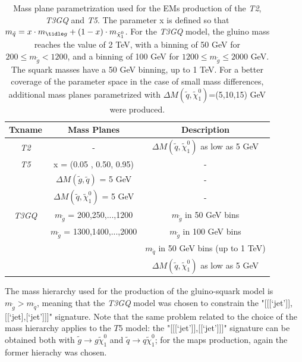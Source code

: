 \documentclass[a4paper,11pt]{article}
\begin{document}
\begin{table}[!htbp]
\footnotesize
\begin{center}
\renewcommand{\arraystretch}{1.4}
\begin{tabular}{ c c c} 
\toprule 
  \textbf{Txname} & \textbf{Mass Planes} & \textbf{Description} \\ \toprule \toprule
  \textit{T2} & - & $\Delta M(\tilde q, \tilde \chi _1 ^0)$ as low as 5 GeV \\ \midrule
  \textit{T5} & x = (0.05 , 0.50, 0.95) & - \\
       &  $\Delta M(\tilde g, \tilde q )$ = 5 GeV & - \\
       &  $\Delta M(\tilde q, \tilde \chi _1 ^0)$ = 5 GeV        & - \\ \midrule
  \textit{T3GQ}  &  $m_{\tilde g}$ = 200,250,...,1200       &  $m_{\tilde g}$ in 50 GeV bins \\ 
                 &  $m_{\tilde g}$ = 1300,1400,...,2000    &  $m_{\tilde g}$ in  100 GeV bins \\
                 &                                                                                                                  & $m_{\tilde q}$ in 50 GeV bins (up to 1 TeV) \\
                 &                                                                                                                         &  $\Delta M(\tilde q, \tilde \chi _1 ^0)$ as low as 5 GeV \\ 
\bottomrule \bottomrule
\end{tabular}
\end{center}
\caption{Mass plane parametrization used for the EMs production of the \textit{T2}, \textit{T3GQ} and \textit{T5}. The parameter x is defined so that $m_{\tilde q}= x\cdot m_{\tidle g} + (1-x)\cdot m_{\tilde \chi_1 ^0}$. For the \textit{T3GQ} model, the gluino mass reaches the value of 2 TeV, with a binning of 50 GeV for $200 \leq m_{\tilde g} < 1200$, and a binning of 100 GeV for $1200 \leq m_{\tilde g}  \leq 2000$ GeV. The squark masses have a 50 GeV binning, up to 1 TeV. For a better coverage of the parameter space in the case of small mass differences, additional mass planes parametrized with $\Delta M ( \tilde q, \tilde \chi _1 ^0)$=(5,10,15) GeV were produced. }
\label{TGQ_Planes} 
\end{table}
%
%
The mass hierarchy used for the production of the gluino-squark model is $m_{\tilde g} > m_{\tilde q}$, meaning that the \textit{T3GQ} model was chosen to constrain the "[[[`jet']],[[`jet],[`jet']]]" signature. Note that the same problem related to the choice of the mass hierarchy applies to the $T5$ model: the "[[[`jet']],[[`jet']]]" signature can be obtained both with $\tilde g \rightarrow g \tilde \chi _1 ^0$ and $\tilde q \rightarrow q \tilde \chi _1 ^0$; for the maps production, again the former hierachy was chosen. 
\end{document}
